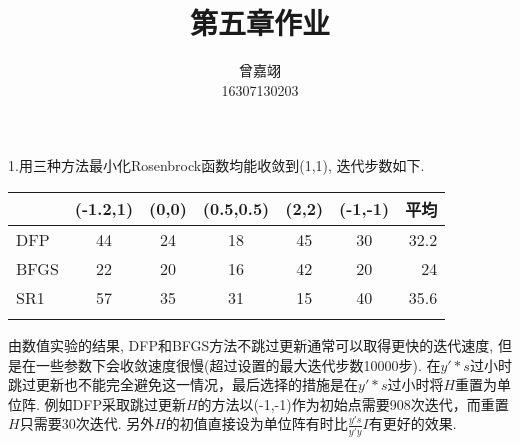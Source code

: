 \documentclass{article}
\title{第五章作业}
\author{曾嘉翊\\16307130203}
\date{}
\begin{document}
\maketitle
1.用三种方法最小化Rosenbrock函数均能收敛到(1,1), 迭代步数如下.\\

\begin{tabular}{lcccccr}
\hline
 & (-1.2,1)& (0,0)& (0.5,0.5)& (2,2)& (-1,-1)& 平均\\
\hline
DFP& 44& 24& 18& 45& 30& 32.2\\
BFGS& 22& 20& 16& 42& 20& 24\\
SR1& 57& 35& 31& 15& 40& 35.6\\
\hline\\
\end{tabular}
    
    由数值实验的结果, DFP和BFGS方法不跳过更新通常可以取得更快的迭代速度, 但是在一些参数下会收敛速度很慢(超过设置的最大迭代步数10000步). 在$y'*s$过小时跳过更新也不能完全避免这一情况，最后选择的措施是在$y'*s$过小时将$H$重置为单位阵. 例如DFP采取跳过更新$H$的方法以(-1,-1)作为初始点需要908次迭代，而重置$H$只需要30次迭代. 另外$H$的初值直接设为单位阵有时比$\frac{y's}{y'y} I$有更好的效果.
\end{document}
